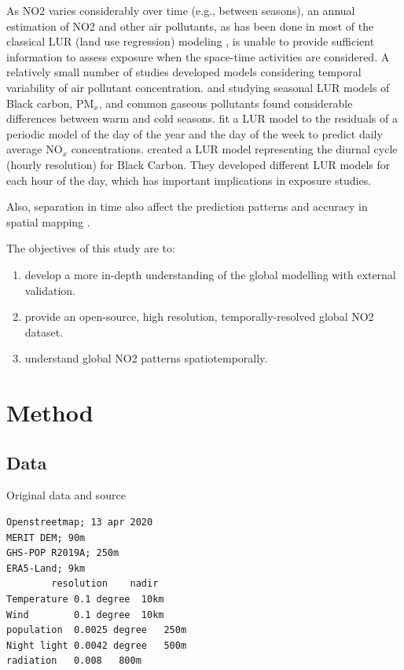 \documentclass{article}
\begin{document}
As NO2 varies considerably over time (e.g., between seasons), an annual estimation of NO2 and other air pollutants, as has been done in most of the classical LUR (land use regression) modeling \citep{Eeftens2012}, is unable to provide sufficient information to assess exposure when the space-time activities are considered. A relatively small number of studies developed models considering temporal variability of air pollutant concentration. \cite{BONIARDI2019108520} and \cite{CORDIOLI20171075} studying seasonal LUR models of Black carbon, PM$_x$, and common gaseous pollutants found considerable differences between warm and cold seasons.  \cite{rahman2017development} fit a LUR model to the residuals of a  periodic model of the day of the year and the day of the week to predict daily average  NO$_x$ concentrations. \cite{dons2013modeling} created a LUR model representing the diurnal cycle (hourly resolution) for Black Carbon. They developed different LUR models for each hour of the day, which has important implications in exposure studies.

Also, separation in time also affect the prediction patterns and accuracy in spatial mapping \citep{LU2020105856}.

   

The objectives of this study are to: 
 \begin{enumerate}
\item develop a more in-depth understanding of the global modelling with external validation. 


\item provide an open-source, high resolution, temporally-resolved global NO2 dataset.

\item understand global NO2 patterns spatiotemporally. 
 
\end{enumerate}



 

\section{Method}
\subsection{Data}

Original data and source
\begin{verbatim}
Openstreetmap; 13 apr 2020
MERIT DEM; 90m
GHS-POP R2019A; 250m
ERA5-Land; 9km
        resolution	  nadir
Temperature	0.1 degree	10km
Wind 	    0.1 degree	10km
population	0.0025 degree 	250m
Night light	0.0042 degree	500m
radiation	0.008	800m

\end{verbatim}
\end{document}
